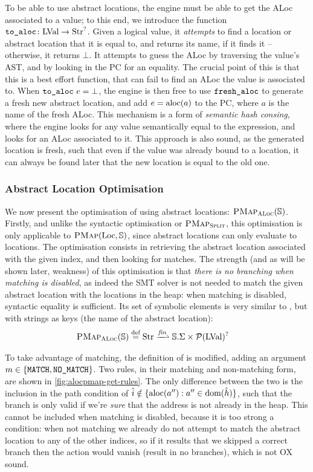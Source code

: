 To be able to use abstract locations, the engine must be able to get the ALoc associated to a value; to this end, we introduce the function $\texttt{to\_aloc}\colon \text{LVal}\rightarrow\text{Str}^?$. Given a logical value, it \emph{attempts} to find a location or abstract location that it is equal to, and returns its name, if it finds it -- otherwise, it returns $\bot$. It attempts to guess the ALoc by traversing the value's AST, and by looking in the PC for an equality. The crucial point of this is that this is a best effort function, that can fail to find an ALoc the value is associated to. When $\texttt{to\_aloc}~e=\bot$, the engine is then free to use $\texttt{fresh\_aloc}$ to generate a fresh new abstract location, and add $e=\text{aloc}(a)$ to the PC, where $a$ is the name of the fresh ALoc. This mechanism is a form of \emph{semantic hash consing}, where the engine looks for any value semantically equal to the expression, and looks for an ALoc associated to it. This approach is also sound, as the generated location is fresh, such that even if the value was already bound to a location, it can always be found later that the new location is equal to the old one.

\subsubsection{Abstract Location Optimisation}

We now present the optimisation of \PMap{} using abstract locations: $\textsc{PMap}_{\textsc{ALoc}}(\mathbb S)$. Firstly, and unlike the syntactic optimisation or $\textsc{PMap}_{\textsc{Split}}$, this optimisation is only applicable to $\textsc{PMap}(\text{Loc},\mathbb S)$, since abstract locations can only evaluate to locations. The optimisation consists in retrieving the abstract location associated with the given index, and then looking for matches. The strength (and as will be shown later, weakness) of this optimisation is that \emph{there is no branching when matching is disabled}, as indeed the SMT solver is not needed to match the given abstract location with the locations in the heap: when matching is disabled, syntactic equality is sufficient. Its set of symbolic elements is very similar to \PMap, but with strings as keys (the name of the abstract location): \begin{align*}
	\ALocPMap(\mmdl) &\defeq \Str \finmap \mmdl.\Sigma \times \pset(\LVal)^?
\end{align*}

To take advantage of matching, the definition of  is modified, adding an argument $m\in\{\texttt{MATCH},\texttt{NO\_MATCH}\}$. Two rules, in their matching and non-matching form, are shown in \autoref{fig:alocpmap-get-rules}. The only difference between the two is the inclusion in the path condition of ${\hat{i}\notin\{\text{aloc}(a''):a''\in \operatorname{dom}(\hat{h})\}}$, such that the branch is only valid if we're \emph{sure} that the address is not already in the heap. This cannot be included when matching is disabled, because it is too strong a condition: when not matching we already do not attempt to match the abstract location to any of the other indices, so if it results that we skipped a correct branch then the action would vanish (result in no branches), which is not OX sound.

